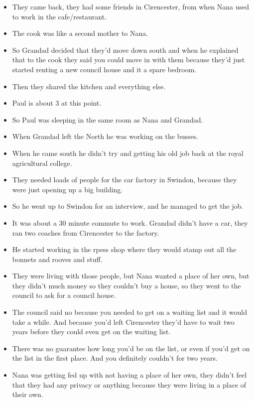 \documentclass[10pt,twocolumn,letterpaper]{article}
\begin{document}
\begin{itemize}
    \item They came back, they had some friends in Cirencester, from when Nana used to work in the cafe/restaurant.
    \item The cook was like a second mother to Nana. 
    \item So Grandad decided that they'd move down south and when he explained that to the cook they said you could move in with them because they'd just started renting a new council house and it a spare bedroom.
    \item Then they shared the kitchen and everything else.
    \item Paul is about 3 at this point.
    \item So Paul was sleeping in the same room as Nana and Grandad.
    \item When Grandad left the North he was working on the busses.
    \item When he came south he didn't try and getting his old job back at the royal agricultural college.
    \item They needed loads of people for the car factory in Swindon, because they were just opening up a big building.
    \item So he went up to Swindon for an interview, and he managed to get the job.
    \item It was about a 30 minute commute to work. Grandad didn't have a car, they ran two coaches from Cirencester to the factory.
    \item He started working in the rpess shop where they would stamp out all the bonnets and rooves and stuff.
    \item They were living with those people, but Nana wanted a place of her own, but they didn't much money so they couldn't buy a house, so they went to the council to ask for a council house.
    \item The council said no because you needed to get on a waiting list and it would take a while. And because you'd left Cirencester they'd have to wait two years before they could even get on the waiting list.
    \item There was no guarantee how long you'd be on the list, or even if you'd get on the list in the first place. And you definitely couldn't for two years.
    \item Nana was getting fed up with not having a place of her own, they didn't feel that they had any privacy or anything because they were living in a place of their own.

\end{itemize}
\end{document}
